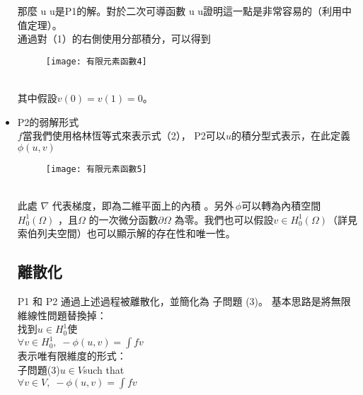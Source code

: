 \begin{itemize}
\qquad 那麼 u u是P1的解。對於二次可導函數 u u證明這一點是非常容易的（利用中值定理）。\\

\qquad 通過對（1）的右側使用分部積分，可以得到 \\
\begin{figure}[hbt!]
\begin{center}
\texttt{[image: 有限元素函數4]}
\end{center}
\end{figure}
\\
其中假設$ v(0)=v(1)=0$。\\

\item P2的弱解形式\\

\qquad $ f$當我們使用格林恆等式來表示式（2）， P2可以$ u$的積分型式表示，在此定義$ {\displaystyle \phi (u,v)} $\\
\begin{figure}[hbt!]
\begin{center}
\texttt{[image: 有限元素函數5]}
\end{center}
\end{figure}
\\
\qquad 此處 $ \nabla$ 代表梯度，即為二維平面上的內積 。另外$ {\displaystyle \,\!\phi }$可以轉為內積空間$ {\displaystyle H_{0}^{1}(\Omega )}$ ，且$ \Omega$ 的一次微分函數$ \partial \Omega$ 為零。我們也可以假設$ {\displaystyle v\in H_{0}^{1}(\Omega )}$（詳見索伯列夫空間）也可以顯示解的存在性和唯一性。\\ 

\subsection{離散化}

\qquad P1 和 P2 通過上述過程被離散化，並簡化為 子問題 (3)。 基本思路是將無限維線性問題替換掉：\\

    找到$ {\displaystyle u\in H_{0}^{1}} $使\\
	
    $ {\displaystyle \forall v\in H_{0}^{1},\;-\phi (u,v)=\int fv}$\\

表示唯有限維度的形式：\\

    子問題(3)$ {\displaystyle u\in V} $such that\\
	
    $ {\displaystyle \forall v\in V,\;-\phi (u,v)=\int fv}$\\
	

\end{itemize}
